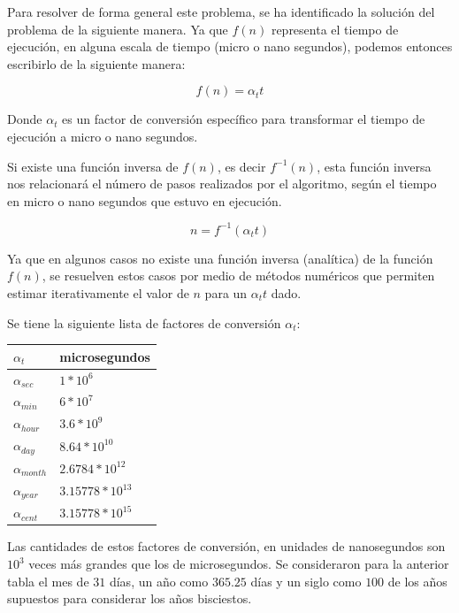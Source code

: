 \documentclass{article}
\begin{document}
Para resolver de forma general este problema, se ha identificado la solución del problema de la siguiente manera. Ya que $f(n)$ representa el tiempo de ejecución, en alguna escala de tiempo (micro o nano segundos), podemos entonces escribirlo de la siguiente manera:

$$f(n) = \alpha_t t$$

Donde $\alpha_t$ es un factor de conversión específico para transformar el tiempo de ejecución a micro o nano segundos.

Si existe una función inversa de $f(n)$, es decir $f^{-1}(n)$, esta función inversa nos relacionará el número de pasos realizados por el algoritmo, según el tiempo en micro o nano segundos que estuvo en ejecución.

$$n = f^{-1}(\alpha_t t)$$

Ya que en algunos casos no existe una función inversa (analítica) de la función $f(n)$, se resuelven estos casos por medio de métodos numéricos que permiten estimar iterativamente el valor de $n$ para un $\alpha_t t$ dado.

Se tiene la siguiente lista de factores de conversión $\alpha_t$:

\begin{longtable}[H]{|p{2.5cm}|p{2.5cm}|}
  \hline
  $\alpha_t$ & microsegundos \\ \hline
  $\alpha_{sec}$ & $1*10^6$ \\ \hline
  $\alpha_{min}$ & $6*10^7$ \\ \hline
  $\alpha_{hour}$ & $3.6*10^9$ \\ \hline
  $\alpha_{day}$ & $8.64*10^{10}$ \\ \hline
  $\alpha_{month}$ & $2.6784*10^{12}$ \\ \hline
  $\alpha_{year}$ & $3.15778*10^{13}$ \\ \hline
  $\alpha_{cent}$ & $3.15778*10^{15}$ \\ \hline
\end{longtable}

Las cantidades de estos factores de conversión, en unidades de nanosegundos son $10^3$ veces más grandes que los de microsegundos. Se consideraron para la anterior tabla el mes de $31$ días, un año como $365.25$ días y un siglo como $100$ de los años supuestos para considerar los años bisciestos.
\end{document}
